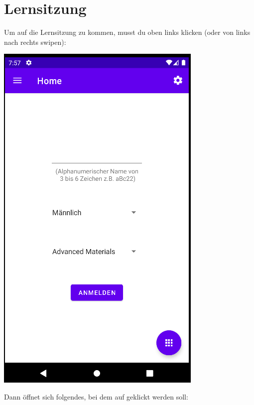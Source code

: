 \documentclass[ngerman]{tutorial}
\begin{document}
\section{Lernsitzung}
Um auf die Lernsitzung zu kommen, musst du oben links klicken (oder von links nach rechts swipen):
\begin{center}
    \includegraphics[scale=0.45]{start_reg.png}
\end{center}
Dann öffnet sich folgendes, bei dem auf  geklickt werden soll:
\end{document}
